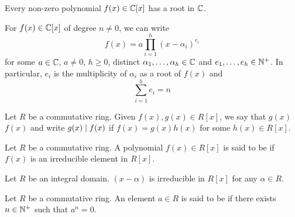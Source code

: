 \begin{theorem} \label{thm:FTA1}
    Every non-zero polynomial $f(x) \in \mathbb{C}[x]$ has a root in $\mathbb{C}$.
\end{theorem}
\begin{theorem} \label{thm:FTA2}
    For $f(x) \in \mathbb{C}[x]$ of degree $n \neq 0$, we can write
    \[
        f(x) = a \prod_{i=1}^h (x-\alpha_i)^{e_i}
    \]
    for some $a \in \mathbb{C}$, $a \neq 0$, $h \geq 0$, distinct $\alpha_1, \ldots, \alpha_h \in \mathbb{C}$ and $e_1, \ldots, e_h \in \mathbb{N}^+$. In particular, $e_i$ is the multiplicity of $\alpha_i$ as a root of $f(x)$ and
    \[
        \sum_{i=1}^h e_i = n
    \]
\end{theorem}

\begin{defn}
    Let $R$ be a commutative ring. Given $f(x),g(x) \in R[x]$, we say that $g(x)$  $f(x)$ and write $g(x) \mid f(x)$ if $f(x) = g(x)h(x)$ for some $h(x) \in R[x]$.
\end{defn}

\begin{defn}
    Let $R$ be a commutative ring. A polynomial $f(x) \in R[x]$ is said to be  if $f(x)$ is an irreducible element in $R[x]$.
\end{defn}

\begin{prop} \label{prop:linear-irreducible}
    Let $R$ be an integral domain. $(x-\alpha)$ is irreducible in $R[x]$ for any $\alpha \in R$.
\end{prop}

\begin{defn}
    Let $R$ be a commutative ring. An element $a \in R$ is said to be  if there exists $n \in \mathbb{N}^+$ such that $a^n = 0$.
\end{defn}

